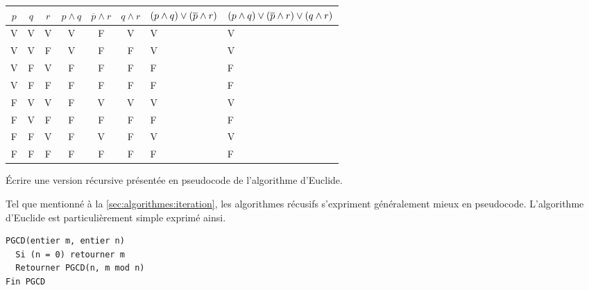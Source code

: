 \begin{exercice}
\begin{sol}
\begin{enumerate}
\begin{tabularx}{\linewidth}{*{6}{c}>{\centering\arraybackslash}X>{\centering\arraybackslash}X}
        \toprule
        $p$ & $q$ & $r$ & $p \wedge q$ & $\overline{p} \wedge r$ & $q \wedge r$ & $(p \wedge q) \newline\vee (\overline{p} \wedge r)$ & $(p \wedge q) \newline\vee (\overline{p} \wedge r) \newline\vee (q \wedge r)$
        \\
        \midrule
        V & V & V & V & F & V & V & V \\
        V & V & F & V & F & F & V & V \\
        V & F & V & F & F & F & F & F \\
        V & F & F & F & F & F & F & F \\
        F & V & V & F & V & V & V & V \\
        F & V & F & F & F & F & F & F \\
        F & F & V & F & V & F & V & V \\
        F & F & F & F & F & F & F & F \\
        \bottomrule
      \end{tabularx}
    \end{enumerate}
  \end{sol}
\end{exercice}

\begin{exercice}
  Écrire une version récursive présentée en pseudocode de l'algorithme
  d'Euclide.
  \begin{sol}
    Tel que mentionné à la \autoref{sec:algorithmes:iteration}, les
    algorithmes récusifs s'expriment généralement mieux en pseudocode.
    L'algorithme d'Euclide est
    particulièrement simple exprimé ainsi.
    \begin{Schunk}
\begin{Verbatim}
PGCD(entier m, entier n)
  Si (n = 0) retourner m
  Retourner PGCD(n, m mod n)
Fin PGCD
\end{Verbatim}
    \end{Schunk}
  \end{sol}
\end{exercice}

